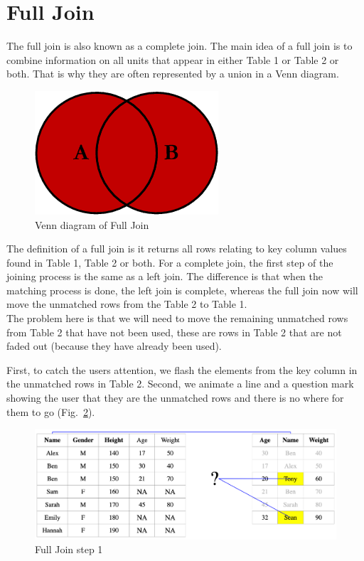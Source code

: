 \section{Full Join}
The full join is also known as a complete join. The main idea of a full join is to combine information on all units that appear in either Table 1 or Table 2 or both. That is why they are often represented by a union in a Venn diagram.

\begin{figure}[H]
    \centering
    \includegraphics[scale = 0.5]{Masters-Thesis/img/vennfull.png}
    \caption{Venn diagram of Full Join}
    \label{fig:vennfull}
\end{figure}

The definition of a full join is it returns all rows relating to key column values found in Table 1, Table 2 or both. For a complete join, the first step of the joining process is the same as a left join. The difference is that when the matching process is done, the left join is complete, whereas the full join now will move the unmatched rows from the Table 2 to Table 1. \\

The problem here is that we will need to move the remaining unmatched rows from Table 2 that have not been used, these are rows in Table 2 that are not faded out (because they have already been used). 

First, to catch the users attention, we flash the elements from the key column in the unmatched rows in Table 2.
Second, we animate a line and a question mark showing the user that they are the unmatched rows and there is no where for them to go (Fig.~\ref{fig:full1}).

\begin{figure}[H]
    \includegraphics[scale = 0.25]{Masters-Thesis/img/full1.png}
    \caption{Full Join step 1}
    \label{fig:full1}
\end{figure}

